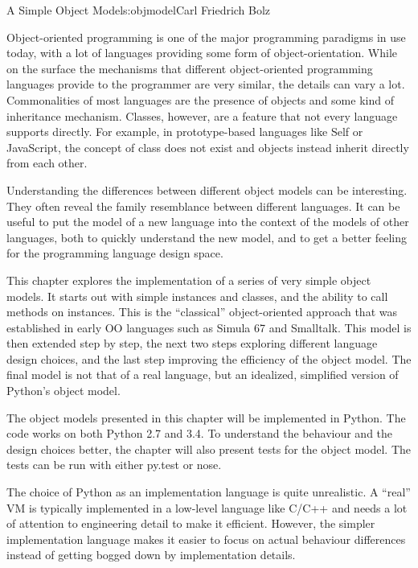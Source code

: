 \begin{aosachapter}{A Simple Object Model}{s:objmodel}{Carl Friedrich Bolz}

\label{introduction}

Object-oriented programming is one of the major programming paradigms in
use today, with a lot of languages providing some form of
object-orientation. While on the surface the mechanisms that different
object-oriented programming languages provide to the programmer are very
similar, the details can vary a lot. Commonalities of most languages are
the presence of objects and some kind of inheritance mechanism. Classes,
however, are a feature that not every language supports directly. For
example, in prototype-based languages like Self or JavaScript, the
concept of class does not exist and objects instead inherit directly
from each other.

Understanding the differences between different object models can be
interesting. They often reveal the family resemblance between different
languages. It can be useful to put the model of a new language into the
context of the models of other languages, both to quickly understand the
new model, and to get a better feeling for the programming language
design space.

This chapter explores the implementation of a series of very simple
object models. It starts out with simple instances and classes, and the
ability to call methods on instances. This is the ``classical''
object-oriented approach that was established in early OO languages such
as Simula 67 and Smalltalk. This model is then extended step by step,
the next two steps exploring different language design choices, and the
last step improving the efficiency of the object model. The final model
is not that of a real language, but an idealized, simplified version of
Python's object model.

The object models presented in this chapter will be implemented in
Python. The code works on both Python 2.7 and 3.4. To understand the
behaviour and the design choices better, the chapter will also present
tests for the object model. The tests can be run with either py.test or
nose.

The choice of Python as an implementation language is quite unrealistic.
A ``real'' VM is typically implemented in a low-level language like
C/C++ and needs a lot of attention to engineering detail to make it
efficient. However, the simpler implementation language makes it easier
to focus on actual behaviour differences instead of getting bogged down
by implementation details.


\end{aosachapter}
